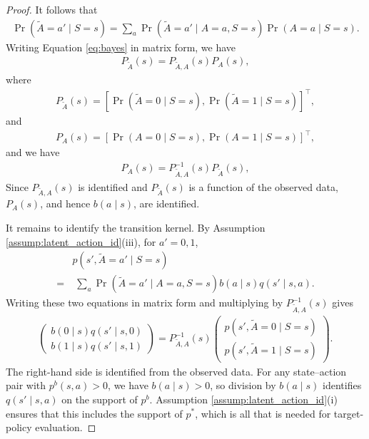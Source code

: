 \documentclass[12pt]{article}
\newcommand{\0}{\boldsymbol{0}}
\begin{document}
\begin{proof}
It follows that \begin{gather} \label{eq:bayes}
    \Pr(\widetilde A=a'\mid S=s)=\sum_{a} \Pr(\widetilde A=a'\mid A=a, S=s)\Pr(A=a\mid  S=s).
\end{gather} Writing Equation \eqref{eq:bayes} in matrix form, we have \begin{gather*}
    P_{\widetilde A}(s)=P_{\widetilde A,A}(s) P_{A}(s),
\end{gather*} where \begin{gather*}
    P_{\widetilde A}(s)=\left[\Pr(\widetilde A=0\mid S=s),\Pr(\widetilde A=1\mid S=s)\right]^\top,
\end{gather*} and
\begin{gather*}
    P_{A}(s)=\left[\Pr( A=0\mid S=s),\Pr( A=1\mid S=s)\right]^\top,
\end{gather*}
 and we have \begin{gather*}
    P_{A}(s)=P_{\widetilde A,A}^{-1}(s) P_{\widetilde A}(s),
\end{gather*}
Since $P_{\widetilde A,A}(s)$ is identified and $P_{\widetilde A}(s)$ is a function of the observed data, $P_A(s)$, and hence $b(a\mid s)$, are identified.

It remains to identify the transition kernel. By Assumption \ref{assump:latent_action_id}(iii), for $a'=0,1$,
\begin{align*}
    &p(s',\widetilde A=a'\mid S=s)\\
    = &\;\sum_a \Pr(\widetilde A=a'\mid A=a,S=s)b(a\mid s)q(s'\mid s,a).
\end{align*}
Writing these two equations in matrix form and multiplying by $P_{\widetilde A,A}^{-1}(s)$ gives
\begin{gather*}
    \begin{pmatrix}
        b(0\mid s)q(s'\mid s,0)\\
        b(1\mid s)q(s'\mid s,1)
    \end{pmatrix}
    =P_{\widetilde A,A}^{-1}(s)
    \begin{pmatrix}
        p(s',\widetilde A=0\mid S=s)\\
        p(s',\widetilde A=1\mid S=s)
    \end{pmatrix}.
\end{gather*}
The right-hand side is identified from the observed data. For any state--action pair with $p^b(s,a)>0$, we have $b(a\mid s)>0$, so division by $b(a\mid s)$ identifies $q(s'\mid s,a)$ on the support of $p^b$. Assumption \ref{assump:latent_action_id}(i) ensures that this includes the support of $p^*$, which is all that is needed for target-policy evaluation.


\end{proof}
\end{document}
